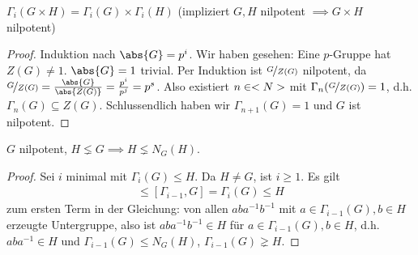 \begin{proposition}
	$\Gamma_i(G\times H) = \Gamma_i(G)\times \Gamma_i(H)$ (impliziert $G,H$ nilpotent $\implies G \times H$ nilpotent)
\end{proposition}
\begin{proof}
	Induktion nach $\abs{G} = p^i$. Wir haben gesehen: Eine $p$-Gruppe hat $Z(G)\neq 1$. $\abs{G} = 1$ trivial. Per Induktion ist $\lnkset{G}{Z(G)}$ nilpotent, da $\lnkset{G}{Z(G)} = \frac{\abs{G}}{\abs{Z(G)}} = \frac{p^i}{p^j} = p^s$. Also existiert $n \in <N>$ mit $\Gamma_n(\lnkset{G}{Z(G)}) = 1$, d.h. $\Gamma_n(G) \subseteq Z(G)$. Schlussendlich haben wir $\Gamma_{n+1}(G) = 1$ und $G$ ist nilpotent.
\end{proof}
\begin{lemma}
	$G$ nilpotent, $H \lneq G \implies H \lneq N_G(H)$.
\end{lemma}
\begin{proof}
	Sei $i$ minimal mit $\Gamma_i(G) \le H$. Da $H \neq G$, ist $i \ge 1$. Es gilt 
	\begin{align*}
		[\Gamma_{i-1}(G),H] \le [\Gamma_{i-1},G] = \Gamma_i(G) \le H
	\end{align*}
	zum ersten Term in der Gleichung: von allen $aba^{-1}b^{-1}$ mit $a\in \Gamma_{i-1}(G),b \in H$ erzeugte Untergruppe, also ist $aba^{-1}b^{-1} \in H$ für $a \in \Gamma_{i-1}(G), b \in H$, d.h. $aba^{-1} \in H$ und $\Gamma_{i-1}(G) \le N_G(H)$, $\Gamma_{i-1}(G) \gneq H$.
\end{proof}
